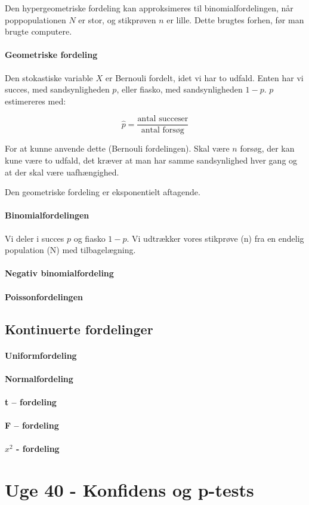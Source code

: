 \documentclass{article}
\begin{document}
Den hypergeometriske fordeling kan approksimeres til binomialfordelingen, når
poppopulationen $N$ er stor, og stikprøven $n$ er lille. Dette brugtes forhen,
før man brugte computere.

\paragraph{Geometriske fordeling}
Den stokastiske variable $X$ er Bernouli fordelt, idet vi har to udfald. Enten
har vi succes, med sandsynligheden $p$, eller fiasko, med sandsynligheden $1-p$.
$p$ estimereres med:

$$\hat{p} = \frac{\text{antal succeser}}{\text{antal forsøg}}$$

For at kunne anvende dette (Bernouli fordelingen). Skal være $n$ forsøg, der kan
kune være to udfald, det kræver at man har samme sandsynlighed hver gang og at
der skal være uafhængighed. 

Den geometriske fordeling er eksponentielt aftagende.
\paragraph{Binomialfordelingen}
Vi deler i succes $p$ og fiasko $1-p$. Vi udtrækker vores stikprøve (n) fra en
endelig population (N) med tilbagelægning.


\paragraph{Negativ binomialfordeling}
\paragraph{Poissonfordelingen}

\subsection{Kontinuerte fordelinger}
\paragraph{Uniformfordeling}
\paragraph{Normalfordeling}
\paragraph{t – fordeling}
\paragraph{F – fordeling}
\paragraph{$x^2$  - fordeling}

\newpage

\section{Uge 40 - Konfidens og p-tests}
\end{document}
